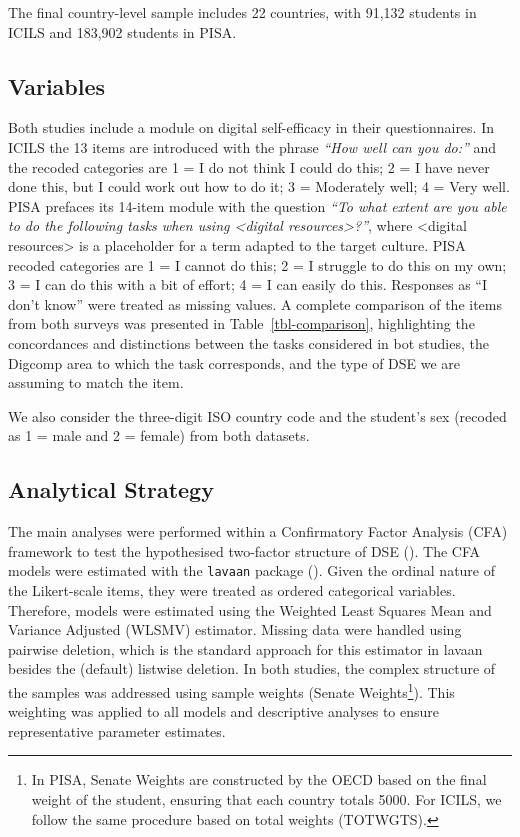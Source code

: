 \documentclass[
  letterpaper,
  DIV=11,
  numbers=noendperiod]{scrartcl}
\begin{document}
The final country-level sample includes 22 countries, with 91,132
students in ICILS and 183,902 students in PISA.

\subsection{Variables}\label{variables}

Both studies include a module on digital self-efficacy in their
questionnaires. In ICILS the 13 items are introduced with the phrase
\emph{``How well can you do:''} and the recoded categories are 1 = I do
not think I could do this; 2 = I have never done this, but I could work
out how to do it; 3 = Moderately well; 4 = Very well. PISA prefaces its
14-item module with the question \emph{``To what extent are you able to
do the following tasks when using \textless digital
resources\textgreater?''}, where \textless digital
resources\textgreater{} is a placeholder for a term adapted to the
target culture. PISA recoded categories are 1 = I cannot do this; 2 = I
struggle to do this on my own; 3 = I can do this with a bit of effort; 4
= I can easily do this. Responses as ``I don't know'' were treated as
missing values. A complete comparison of the items from both surveys was
presented in Table~\ref{tbl-comparison}, highlighting the concordances
and distinctions between the tasks considered in bot studies, the
Digcomp area to which the task corresponds, and the type of DSE we are
assuming to match the item.

We also consider the three-digit ISO country code and the student's sex
(recoded as 1 = male and 2 = female) from both datasets.

\subsection{Analytical Strategy}\label{analytical-strategy}

The main analyses were performed within a Confirmatory Factor Analysis
(CFA) framework to test the hypothesised two-factor structure of DSE
(). The CFA models
were estimated with the \texttt{lavaan} package
(). Given the ordinal
nature of the Likert-scale items, they were treated as ordered
categorical variables. Therefore, models were estimated using the
Weighted Least Squares Mean and Variance Adjusted (WLSMV) estimator.
Missing data were handled using pairwise deletion, which is the standard
approach for this estimator in lavaan besides the (default) listwise
deletion. In both studies, the complex structure of the samples was
addressed using sample weights (Senate Weights\footnote{In PISA, Senate
  Weights are constructed by the OECD based on the final weight of the
  student, ensuring that each country totals 5000. For ICILS, we follow
  the same procedure based on total weights (TOTWGTS).}). This weighting
was applied to all models and descriptive analyses to ensure
representative parameter estimates.
\end{document}
